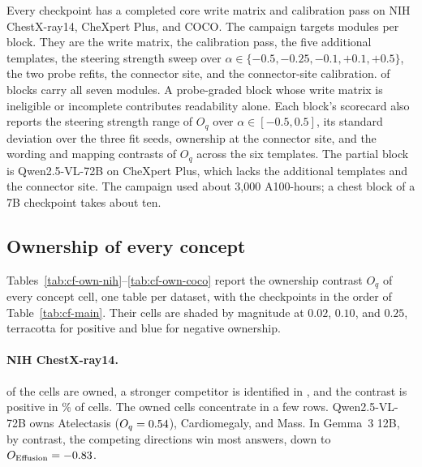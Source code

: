 Every checkpoint has a completed core write matrix and calibration pass on NIH ChestX-ray14, CheXpert Plus, and COCO. The campaign targets \cfCoveragePlannedWord{} modules per block. They are the write matrix, the calibration pass, the five additional templates, the steering strength sweep over $\alpha\in\{-0.5,-0.25,-0.1,+0.1,+0.5\}$, the two probe refits, the connector site, and the connector-site calibration. \cfCoverageBlocksAllSeven{} of \cfBlocks{} blocks carry all seven modules. A probe-graded block whose write matrix is ineligible or incomplete contributes readability alone. Each block's scorecard also reports the steering strength range of $O_q$ over $\alpha\in[-0.5,0.5]$, its standard deviation over the three fit seeds, ownership at the connector site, and the wording and mapping contrasts of $O_q$ across the six templates. The partial block is Qwen2.5-VL-72B on CheXpert Plus, which lacks the additional templates and the connector site. The campaign used about 3,000 A100-hours; a chest block of a 7B checkpoint takes about ten.


\subsection{Ownership of every concept}
\label{app:cf-tables}

Tables~\ref{tab:cf-own-nih}--\ref{tab:cf-own-coco} report the ownership contrast $O_q$ of every concept cell, one table per dataset, with the checkpoints in the order of Table~\ref{tab:cf-main}. Their cells are shaded by magnitude at $0.02$, $0.10$, and $0.25$, terracotta for positive and blue for negative ownership.

\paragraph{NIH ChestX-ray14.} \cfNihOwned{} of the \cfNihCells{} cells are owned, a stronger competitor is identified in \cfNihCompetitor{}, and the contrast is positive in \cfGeoOwnWinsNihPct\% of cells. The owned cells concentrate in a few rows. Qwen2.5-VL-72B owns Atelectasis ($O_q=0.54$), Cardiomegaly, and Mass. In Gemma~3 12B, by contrast, the competing directions win most answers, down to $O_{\mathrm{Effusion}}=-0.83$.




